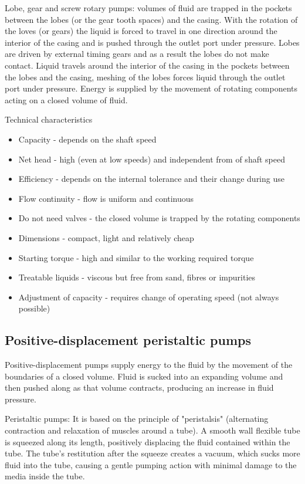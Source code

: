 Lobe, gear and screw rotary pumps: volumes of fluid are trapped in the pockets between the lobes (or the gear tooth spaces) and the casing. With the rotation of the loves (or gears) the liquid is forced to travel in one direction around the interior of the casing and is pushed through the outlet port under pressure. Lobes are driven by external timing gears and as a result the lobes do not make contact. Liquid travels around the interior of the casing in the pockets between the lobes and the casing, meshing of the lobes forces liquid through the outlet port under pressure. Energy is supplied by the movement of rotating components acting on a closed volume of fluid.

Technical characteristics
\begin{itemize}
  \item Capacity - depends on the shaft speed
  \item Net head - high (even at low speeds) and independent from of shaft speed
  \item Efficiency - depends on the internal tolerance and their change during use
  \item Flow continuity - flow is uniform and continuous
  \item Do not need valves - the closed volume is trapped by the rotating components
  \item Dimensions - compact, light and relatively cheap
  \item Starting torque - high and similar to the working required torque
  \item Treatable liquids - viscous but free from sand, fibres or impurities
  \item Adjustment of capacity - requires change of operating speed (not always possible)
\end{itemize}
\subsection{Positive-displacement peristaltic pumps}
Positive-displacement pumps supply energy to the fluid by the movement of the boundaries of a closed volume. Fluid is sucked into an expanding volume and then pushed along as that volume contracts, producing an increase in fluid pressure.

Peristaltic pumps: It is based on the principle of "peristalsis" (alternating contraction and relaxation of muscles around a tube). A smooth wall flexible tube is squeezed along its length, positively displacing the fluid contained within the tube. The tube's restitution after the squeeze creates a vacuum, which sucks more fluid into the tube, causing a gentle pumping action with minimal damage to the media inside the tube.

